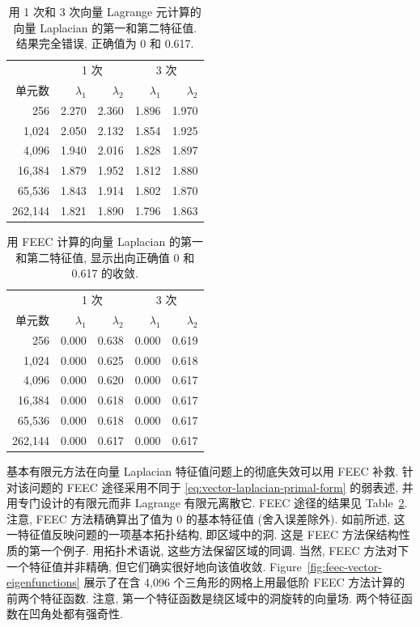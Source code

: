 \begin{table}[H]\centering
\caption{{用 1 次和 3 次向量 Lagrange 元计算的向量 Laplacian 的第一和第二特征值. 结果完全错误, 正确值为 0 和 0.617.}}\label{tab:vector-lagrange-wrong-eigenvalues}
\begin{tabular}{r|rr|rr}\hline
&\multicolumn{2}{c|}{{1 次}}&\multicolumn{2}{c}{{3 次}}\\
{单元数}&$\lambda_1$&$\lambda_2$&$\lambda_1$&$\lambda_2$\\\hline
256&2.270&2.360&1.896&1.970\\
1,024&2.050&2.132&1.854&1.925\\
4,096&1.940&2.016&1.828&1.897\\
16,384&1.879&1.952&1.812&1.880\\
65,536&1.843&1.914&1.802&1.870\\
262,144&1.821&1.890&1.796&1.863\\\hline
\end{tabular}
\end{table}

\begin{table}[H]\centering
\caption{{用 FEEC 计算的向量 Laplacian 的第一和第二特征值, 显示出向正确值 0 和 0.617 的收敛.}}\label{tab:feec-vector-eigenvalues}
\begin{tabular}{r|rr|rr}\hline
&\multicolumn{2}{c|}{{1 次}}&\multicolumn{2}{c}{{3 次}}\\
{单元数}&$\lambda_1$&$\lambda_2$&$\lambda_1$&$\lambda_2$\\\hline
256&0.000&0.638&0.000&0.619\\
1,024&0.000&0.625&0.000&0.618\\
4,096&0.000&0.620&0.000&0.617\\
16,384&0.000&0.618&0.000&0.617\\
65,536&0.000&0.618&0.000&0.617\\
262,144&0.000&0.617&0.000&0.617\\\hline
\end{tabular}
\end{table}

{基本有限元方法在向量 Laplacian 特征值问题上的彻底失效可以用 FEEC 补救. 针对该问题的 FEEC 途径采用不同于 \eqref{eq:vector-laplacian-primal-form} 的弱表述, 并用专门设计的有限元而非 Lagrange 有限元离散它. FEEC 途径的结果见 Table~\ref{tab:feec-vector-eigenvalues}. 注意, FEEC 方法精确算出了值为 0 的基本特征值 (舍入误差除外). 如前所述, 这一特征值反映问题的一项基本拓扑结构, 即区域中的洞. 这是 FEEC 方法保结构性质的第一个例子. 用拓扑术语说, 这些方法保留区域的同调. 当然, FEEC 方法对下一个特征值并非精确, 但它们确实很好地向该值收敛. Figure~\ref{fig:feec-vector-eigenfunctions} 展示了在含 4,096 个三角形的网格上用最低阶 FEEC 方法计算的前两个特征函数. 注意, 第一个特征函数是绕区域中的洞旋转的向量场. 两个特征函数在凹角处都有强奇性.}

